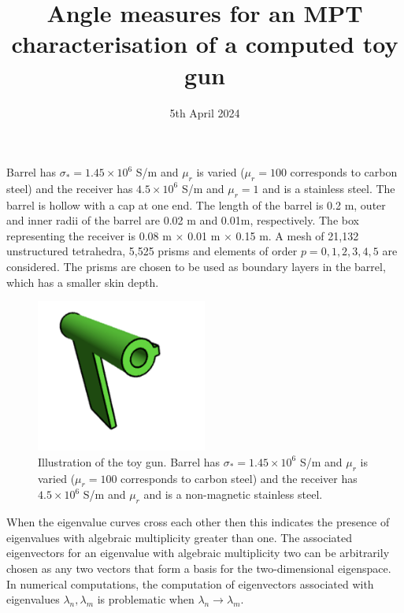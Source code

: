 \documentclass[a4paper,12]{article}
\theoremstyle{definition}
\begin{document}
\title{Angle measures for an MPT characterisation of a computed toy gun}
\date{5th April 2024}
\maketitle

Barrel has $\sigma_* = 1.45\times 10^6$ S/m and $\mu_r$ is varied ($\mu_r=100$ corresponds to carbon steel) and the receiver has $4.5 \times 10^6$ S/m and $\mu_r=1$ and is a stainless steel.  The barrel is hollow with a cap at one end.  The length of the barrel is 0.2 m, outer and inner radii of the barrel are 0.02 m and 0.01m, respectively. The box representing the receiver is 0.08 m $\times$ 0.01 m $\times$ 0.15 m.  A mesh of 21,132 unstructured tetrahedra, 5,525 prisms and elements of order $p=0,1,2,3,4,5$ are considered. The prisms are chosen to be used as boundary layers in the barrel, which has a smaller skin depth. 

\begin{figure}[h]
\begin{center}
\includegraphics[width=0.5\textwidth]{Gun_modelv2_nonsym_StainSt.png}
\end{center}
\caption{Illustration of the toy gun. Barrel has $\sigma_* = 1.45\times 10^6$ S/m and $\mu_r$ is varied ($\mu_r=100$ corresponds to carbon steel) and the receiver has $4.5 \times 10^6$ S/m and $\mu_r$ and is a non-magnetic stainless steel.}
\end{figure}

When the eigenvalue curves  cross each other then this indicates the presence of eigenvalues with algebraic multiplicity greater than one.  The associated eigenvectors for an eigenvalue with algebraic multiplicity two 
 can be arbitrarily chosen as any two vectors that form a basis for the two-dimensional eigenspace.  In numerical computations, the computation of eigenvectors associated with eigenvalues $\lambda_n , \lambda_m$ is problematic when $\lambda_n \to \lambda_m$. 
\end{document}

